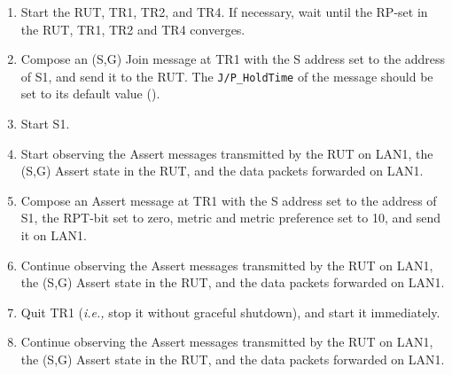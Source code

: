 \documentclass[11pt]{report}
\newcommand{\ie}{\emph{i.e.,}\xspace}
\begin{document}
\begin{enumerate}

  \item Start the RUT, TR1, TR2, and TR4. If necessary, wait until the RP-set
  in the RUT, TR1, TR2 and TR4 converges.

  \item Compose an (S,G) Join message at TR1 with the S address set to the
  address of S1, and send it to the RUT.
  The \verb=J/P_HoldTime= of the message should be set to its default
  value ({\PimsmJPHoldTime}).

  \item Start S1.

  \item Start observing the Assert messages transmitted by the RUT on
  LAN1, the (S,G) Assert state in the RUT, and the data packets forwarded on
  LAN1.

  \item Compose an Assert message at TR1 with the S address set to the
  address of S1, the RPT-bit set to zero, metric and metric preference set to
  10, and send it on LAN1.

  \item Continue observing the Assert messages transmitted by the RUT on
  LAN1, the (S,G) Assert state in the RUT, and the data packets forwarded on
  LAN1.

  \item Quit TR1 (\ie stop it without graceful shutdown), and start it
  immediately.

  \item Continue observing the Assert messages transmitted by the RUT on
  LAN1, the (S,G) Assert state in the RUT, and the data packets forwarded on
  LAN1.

\end{enumerate}

\end{document}
